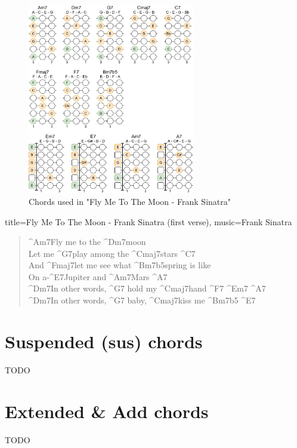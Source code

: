 \begin{figure}[h]
	\centering
	\includegraphics[width=0.65\textwidth]{../../Images/ChordsInFlyMeToTheMoonFrankSinatra.png}
	\caption{Chords used in "Fly Me To The Moon - Frank Sinatra"}
	\label{fig:guitar_chords_fly_me_to_the_moon_frank_sinatra}
\end{figure}

\begin{song}[align-chords=l]{title={Fly Me To The Moon - Frank Sinatra (first verse)}, music={Frank Sinatra}}
	\begin{verse}
		^{Am7}Fly me to the ^{Dm7}moon \\
		Let me ^{G7}play among the ^{Cmaj7}stars ^{C7}  \\
		And ^{Fmaj7}let me see what ^{Bm7b5}spring is like \\
		On a-^{E7}Jupiter and ^{Am7}Mars ^{A7}  \\
		^{Dm7}In other words, ^{G7} hold my ^{Cmaj7}hand ^{F7} ^{Em7} ^{A7}  \\
		^{Dm7}In other words, ^{G7} baby, ^{Cmaj7}kiss me ^{Bm7b5} ^{E7} \\
	\end{verse}
\end{song}

\newpage

\section{Suspended (sus) chords}
TODO

\newpage

\section{Extended \& Add chords}
TODO
